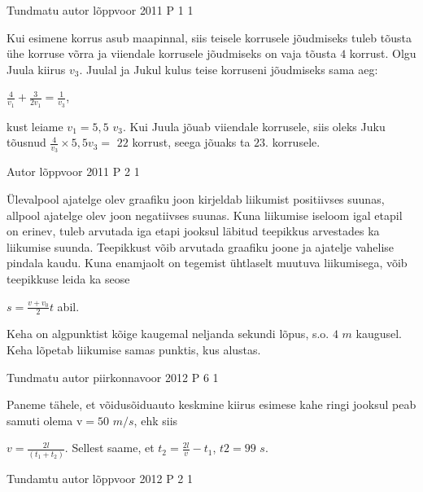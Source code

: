 \documentclass[11pt]{article}
\begin{document}
{%
{Tundmatu autor} %
{lõppvoor} %
{2011} %
{P 1} %
{1} %
{

\ifSolution
Kui esimene korrus asub maapinnal, siis teisele korrusele jõudmiseks tuleb tõusta ühe korruse võrra ja viiendale korrusele jõudmiseks on vaja tõusta $4$ korrust. Olgu Juula kiirus $v_3$. Juulal ja Jukul kulus teise korruseni jõudmiseks sama aeg:
\begin{center}
$\frac{4}{v_1} + \frac{3}{2v_1} = \frac{1}{v_3}$,
\end{center}
kust leiame $v_1 = 5,5$ $v_3$. Kui Juula jõuab viiendale korrusele, siis oleks Juku tõusnud $\frac{4}{v_3} \times 5,5 v_3 =$ $22$ korrust, seega jõuaks ta $23$. korrusele.
\fi
}


{Autor} %
{lõppvoor} %
{2011} %
{P 2} %
{1} %
{

\ifSolution
Ülevalpool ajatelge olev graafiku joon kirjeldab liikumist positiivses suunas, allpool ajatelge olev joon negatiivses suunas. Kuna liikumise iseloom igal etapil on erinev, tuleb arvutada iga etapi jooksul läbitud teepikkus arvestades ka liikumise suunda. Teepikkust võib arvutada graafiku joone ja ajatelje vahelise pindala kaudu. Kuna enamjaolt on tegemist ühtlaselt muutuva liikumisega, võib teepikkuse leida ka seose
\begin{center}
$s = \frac{v+v_0}{2} t$ abil. 
\end{center}
Keha on algpunktist kõige kaugemal neljanda sekundi lõpus, s.o. $4$ $m$ kaugusel. Keha lõpetab liikumise samas punktis, kus alustas.
\fi
}



{Tundmatu autor} %
{piirkonnavoor} %
{2012} %
{P 6} %
{1} %
{

\ifSolution
Paneme tähele, et võidusõiduauto keskmine kiirus esimese kahe ringi jooksul peab samuti olema v$ = 50$ $m/s$, ehk siis 
\begin{center}
$v = \frac{2l}{(t_1 + t_2)}$. Sellest saame, et $t_2 = \frac{2l}{v} - t_1 $, $t2 = 99$ $s$.
\end{center}
\fi
}


{Tundamtu autor} %
{lõppvoor} %
{2012} %
{P 2} %
{1} %
{

}}
\end{document}
